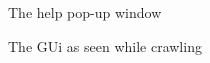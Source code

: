 \begin{figure}[H]

\caption{The help pop-up window}
\end{figure}

\begin{figure}[H]

\caption{The GUi as seen while crawling}
\end{figure}